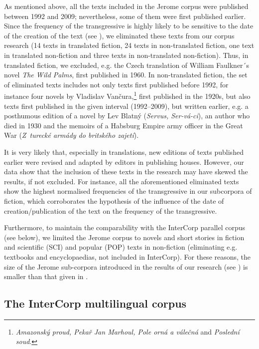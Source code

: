 \documentclass[output=paper,russian]{langsci/langscibook}
\begin{document}
As mentioned above, all the texts included in the Jerome corpus were published between 1992 and 2009; nevertheless, some of them were first published earlier. Since the frequency of the transgressive is highly likely to be sensitive to the date of the creation of the text (see ), we eliminated these texts from our corpus research (14 texts in translated fiction, 24 texts in non-translated fiction, one text in translated non-fiction and three texts in non-translated non-fiction). Thus, in translated fiction, we excluded, e.g. the Czech translation of William Faulkner´s novel \textit{The Wild Palms}, first published in 1960. In non-translated fiction, the set of eliminated texts includes not only texts first published before 1992, for instance four novels by Vladislav Vančura,\footnote{\textit{Amazonský proud, Pekař Jan Marhoul, Pole orná a válečná} and \textit{Poslední soud}.} first published in the 1920s, but also texts first published in the given interval (1992–2009), but written earlier, e.g. a posthumous edition of a novel by Lev Blatný (\textit{Servus, Ser-vá-ci}), an author who died in 1930 and the memoirs of a Habsburg Empire army officer in the Great War (\textit{Z~turecké armády do britského zajetí}).

It is very likely that, especially in translations, new editions of texts published earlier were revised and adapted by editors in publishing houses. However, our data show that the inclusion of these texts in the research may have skewed the results, if not excluded. For instance, all the aforementioned eliminated texts show the highest normalised frequencies of the transgressive in our subcorpora of fiction, which corroborates the hypothesis of the influence of the date of creation/publication of the text on the frequency of the transgressive.

Furthermore, to maintain the comparability with the InterCorp parallel corpus (see below), we limited the Jerome corpus to novels and short stories in fiction and scientific (SCI) and popular (POP) texts in non-fiction (eliminating e.g. textbooks and encyclopaedias, not included in InterCorp). For these reasons, the size of the Jerome sub-corpora introduced in the results of our research (see ) is smaller than that given in .

\subsection{The InterCorp multilingual corpus}\label{olga:intc}
\end{document}
